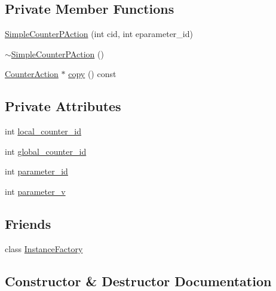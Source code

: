 \subsection*{Private Member Functions}
\begin{DoxyCompactItemize}
\item 
\mbox{\hyperlink{classgraphsat_1_1_simple_counter_p_action_ab42e2533bea10ef444fe74b71e838b15}{Simple\+Counter\+P\+Action}} (int cid, int eparameter\+\_\+id)
\item 
\mbox{\hyperlink{classgraphsat_1_1_simple_counter_p_action_ae503fa1d40ca5fcb38a69b7dfd0a93dd}{$\sim$\+Simple\+Counter\+P\+Action}} ()
\item 
\mbox{\hyperlink{classgraphsat_1_1_counter_action}{Counter\+Action}} $\ast$ \mbox{\hyperlink{classgraphsat_1_1_simple_counter_p_action_ad7a689c0bc048013e29ea4a9c77e7779}{copy}} () const
\end{DoxyCompactItemize}
\subsection*{Private Attributes}
\begin{DoxyCompactItemize}
\item 
int \mbox{\hyperlink{classgraphsat_1_1_simple_counter_p_action_a24a7ea5fc422fb79716c2f32e6fb368a}{local\+\_\+counter\+\_\+id}}
\item 
int \mbox{\hyperlink{classgraphsat_1_1_simple_counter_p_action_aae823e24473b4b4ee4b1172a3444f269}{global\+\_\+counter\+\_\+id}}
\item 
int \mbox{\hyperlink{classgraphsat_1_1_simple_counter_p_action_a32cf3a88d8a5869fd07fabb3e4acead0}{parameter\+\_\+id}}
\item 
int \mbox{\hyperlink{classgraphsat_1_1_simple_counter_p_action_a7cd06392570e53eb0227974e96767ddc}{parameter\+\_\+v}}
\end{DoxyCompactItemize}
\subsection*{Friends}
\begin{DoxyCompactItemize}
\item 
class \mbox{\hyperlink{classgraphsat_1_1_simple_counter_p_action_ad4b3c25c041701ae56dc1e78df779d2f}{Instance\+Factory}}
\end{DoxyCompactItemize}


\subsection{Constructor \& Destructor Documentation}
\mbox{\label{classgraphsat_1_1_simple_counter_p_action_ab42e2533bea10ef444fe74b71e838b15}} 
